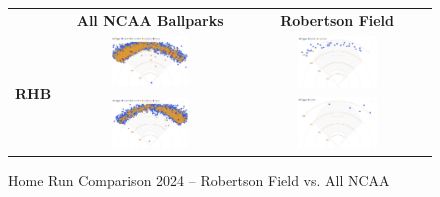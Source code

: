 \documentclass{article}
\begin{document}
\newpage
\begin{figure}[h]
    \centering
    \begin{tabular}{c c c}  
        & \textbf{All NCAA Ballparks} & \textbf{Robertson Field} \\
        \multirow{2}{*}{\textbf{RHB}} &  
        \includegraphics[width=0.45\textwidth]{images/RHB_homers24_NCAA.png} &  
        \includegraphics[width=0.45\textwidth]{images/RHB_homers24_Robertson.png} \\
        \multirow{2}{*}{\textbf{LHB}} &  
        \includegraphics[width=0.45\textwidth]{images/LHB_homers24_NCAA.png} &  
        \includegraphics[width=0.45\textwidth]{images/LHB_homers24_Robertson.png} \\
    \end{tabular}
    \caption{Home Run Comparison 2024 – Robertson Field vs. All NCAA}
    \label{fig:heatmaps}
    \cite{trackman2024}
\end{figure}
\vspace{1cm}
\end{document}
